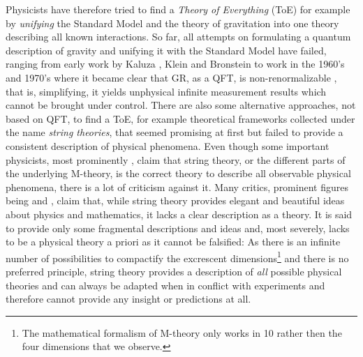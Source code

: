 Physicists have therefore tried to find a \emph{Theory of Everything} (ToE) for example by \emph{unifying} the Standard Model and the theory of gravitation into one theory describing all known interactions. So far, all attempts on formulating a quantum description of gravity and unifying it with the Standard Model have failed, ranging from early work by Kaluza \cite{kaluza1921}, Klein \cite{Klein1926} and Bronstein \cite{bronstein1936} to work in the 1960's and 1970's where it became clear that GR, as a QFT, is non-renormalizable \cite{tHooft1973,tHooft1974,Deser1974}, that is, simplifying, it yields unphysical infinite measurement results which cannot be brought under control.  There are also some alternative approaches, not based on QFT, to find a ToE, for example theoretical frameworks collected under the name \emph{string theories}, that seemed promising at first but failed to provide a consistent description of physical phenomena. Even though some important physicists, most prominently , claim that string theory, or the different parts of the underlying M-theory, is the correct theory to describe all observable physical phenomena, there is a lot of criticism against it. Many critics, prominent figures being  and , claim that, while string theory provides elegant and beautiful ideas about physics and mathematics, it lacks a clear description as a theory. It is said to provide only some fragmental descriptions and ideas and, most severely, lacks to be a physical theory a priori as it cannot be falsified: As there is an infinite number of possibilities to compactify the excrescent dimensions\footnote{The mathematical formalism of M-theory only works in {10} rather then the four dimensions that we observe.} and there is no preferred principle, string theory provides a description of \emph{all} possible physical theories and can always be adapted when in conflict with experiments and therefore cannot provide any insight or predictions at all.\par
%
%
